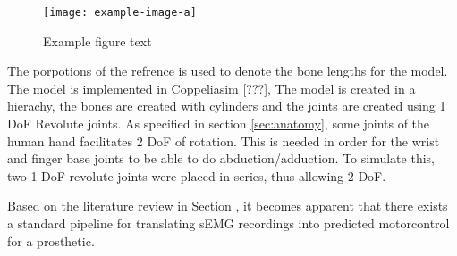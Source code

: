\documentclass[../main.tex]{subfiles}
\begin{document}
\begin{figure}[h]
\begin{center}
\texttt{[image: example-image-a]}
\caption{Example figure text}
\label{fig:handref}
\end{center}
\end{figure}

The porpotions of the refrence is used to denote the bone lengths for the model.
The model is implemented in Coppeliasim \ref{???}, The model is created in a hierachy, the bones are created with cylinders and the joints are created using 1 DoF Revolute joints.
As specified in section \ref{sec:anatomy}, some joints of the human hand facilitates 2 DoF of rotation.
This is needed in order for the wrist and finger base joints to be able to do \gls{abduction/adduction}.
To simulate this, two 1 DoF revolute joints were placed in series, thus allowing 2 DoF.



Based on the literature review in Section \label{sec:literature}, it becomes apparent that there exists a standard pipeline for translating sEMG recordings into predicted motorcontrol for a prosthetic.

\end{document}
